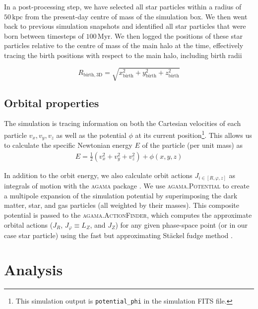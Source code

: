 \documentclass[fleqn,usenatbib]{mnras}
\begin{document}
In a post-processing step, we have selected all star particles within a radius of $50\,\mathrm{kpc}$ from the present-day centre of mass of the simulation box. We then went back to previous simulation snapshots and identified all star particles that were born between timesteps of $100\,\mathrm{Myr}$. We then logged the positions of these star particles relative to the centre of mass of the main halo at the time, effectively tracing the birth positions with respect to the main halo, including birth radii

\begin{equation}
    R_{\mathrm{birth}, \mathrm{3D}} = \sqrt{x_{\mathrm{birth}}^2 + y_{\mathrm{birth}}^2 + z_{\mathrm{birth}}^2}
\end{equation}

\subsection{Orbital properties}  \label{sec:data_orbit_properties}

The simulation is tracing information on both the Cartesian velocities of each particle $v_x, v_y, v_z$ as well as the potential $\phi$ at its current position\footnote{This simulation output is \texttt{potential\_phi} in the simulation FITS file.}. This allows us to calculate the specific Newtonian energy $E$ of the particle (per unit mass) as
\begin{align}
    E = \frac{1}{2}\left( v_x^2 + v_y^2 + v_z^2 \right) + \phi(x,y,z)
\end{align}

In addition to the orbit energy, we also calculate orbit actions $J_{i \in [R, \varphi,z]}$ as integrals of motion with the \textsc{agama} package \citep{Vasiliev2019b}. We use \textsc{agama.Potential} to create a multipole expansion of the simulation potential by superimposing the dark matter, star, and gas particles (all weighted by their masses). This composite potential is passed to the \textsc{agama.ActionFinder}, which computes the approximate orbital actions ($J_R$, $J_\varphi \equiv L_Z$, and $J_Z$) for any given phase-space point (or in our case star particle) using the fast but approximating Stäckel fudge method \citep{Binney2012, Sanders2015b}.

\section{Analysis} \label{sec:analysis}
\end{document}
